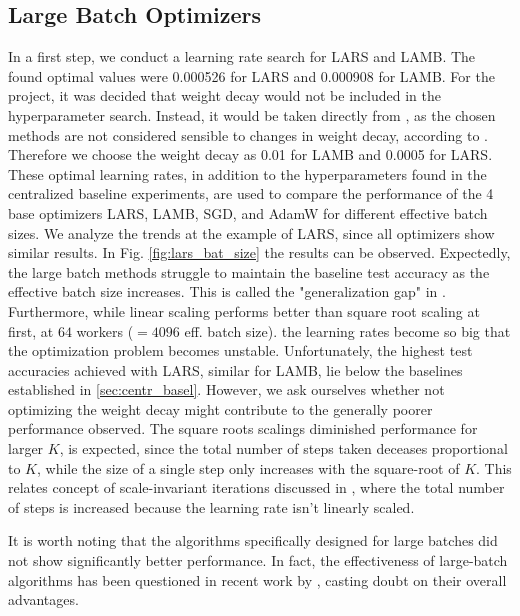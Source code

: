 \documentclass[10pt,twocolumn,letterpaper]{article}
\begin{document}
\subsection{Large Batch Optimizers}
In a first step, we conduct a learning rate search for LARS and LAMB. The found optimal values were 0.000526 for LARS and
0.000908 for LAMB. For the project, it was decided that weight decay would not be included in the hyperparameter search. Instead, it would be taken directly from \cite{you2020largebatchoptimizationdeep}, as the chosen methods are not considered sensible to changes in weight decay, according to \cite{you2017largebatchtrainingconvolutional}\cite{you2020largebatchoptimizationdeep}. Therefore we choose the weight decay as 0.01 for LAMB and 0.0005 for LARS.
These optimal learning rates, in addition to the hyperparameters found in the centralized baseline experiments, are used to compare the performance of the 4 base optimizers LARS, LAMB, SGD, and AdamW for different effective batch sizes. We analyze the trends at the example of LARS, since all optimizers show similar results.
In Fig. \ref{fig:lars_bat_size} the results can be observed. Expectedly, the large batch methods struggle to maintain the baseline test accuracy as the effective batch size increases. This is called the "generalization gap" in \cite{you2017largebatchtrainingconvolutional}. Furthermore, while linear scaling performs better than square root scaling at first, at $64$ workers ($=4096$ eff. batch size). the learning rates become so big that the optimization problem becomes unstable.
Unfortunately, the highest test accuracies achieved with LARS, similar for LAMB, lie below the baselines established in \ref{sec:centr_basel}. However, we ask ourselves whether not optimizing the weight decay might contribute to the generally poorer performance observed.
The square roots scalings diminished performance for larger $K$, is expected, since the total number of steps taken deceases proportional to $K$, while the size of a single step only increases with the square-root of $K$. This relates concept of scale-invariant iterations discussed in \cite{BALLES2024P}, where the total number of steps is increased because the learning rate isn't linearly scaled.

It is worth noting that the algorithms specifically designed for large batches did not show significantly better performance. In fact, the effectiveness of large-batch algorithms has been questioned in recent work by \cite{BALLES2024P}, casting doubt on their overall advantages.
\end{document}
